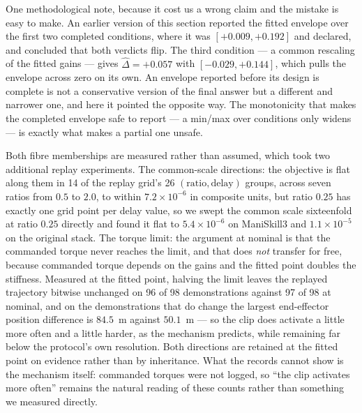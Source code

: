 \documentclass[pdflatex,iicol,sn-apa]{sn-jnl}
\theoremstyle{remark}
\begin{document}
One methodological note, because it cost us a wrong claim and the mistake is easy to make. An
earlier version of this section reported the fitted envelope over the first two completed
conditions, where it was $[+0.009, +0.192]$ and declared, and concluded that both verdicts flip. The
third condition --- a common rescaling of the fitted gains --- gives $\hat\Delta = +0.057$ with
$[-0.029, +0.144]$, which pulls the envelope across zero on its own. An envelope reported before its
design is complete is not a conservative version of the final answer but a different and narrower
one, and here it pointed the opposite way. The monotonicity that makes the completed envelope safe
to report --- a min/max over conditions only widens --- is exactly what makes a partial one unsafe.

Both fibre memberships are measured rather than assumed, which took two additional replay
experiments. The common-scale directions: the objective is flat along them in 14 of the replay
grid's 26 $(\text{ratio}, \text{delay})$ groups, across seven ratios from $0.5$ to $2.0$, to within
$7.2\times10^{-6}$ in composite units, but ratio $0.25$ has exactly one grid point per delay value,
so we swept the common scale sixteenfold at ratio $0.25$ directly and found it flat to
$5.4\times10^{-6}$ on ManiSkill3 and $1.1\times10^{-5}$ on the original stack. The torque limit: the
argument at nominal is that the commanded torque never reaches the limit, and that does \emph{not}
transfer for free, because commanded torque depends on the gains and the fitted point doubles the
stiffness. Measured at the fitted point, halving the limit leaves the replayed trajectory bitwise
unchanged on 96 of 98 demonstrations against 97 of 98 at nominal, and on the demonstrations that do
change the largest end-effector position difference is $84.5$~\textmu m against $50.1$~\textmu m ---
so the clip does activate a little more often and a little harder, as the mechanism predicts, while
remaining far below the protocol's own resolution. Both directions are retained at the fitted point
on evidence rather than by inheritance. What the records cannot show is the mechanism itself:
commanded torques were not logged, so ``the clip activates more often'' remains the natural reading
of these counts rather than something we measured directly.
\end{document}
